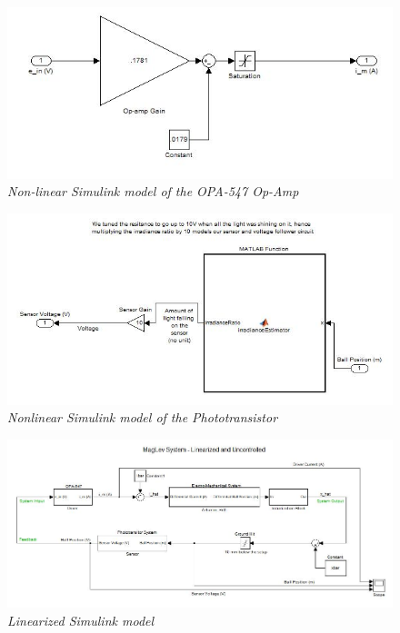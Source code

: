 \documentclass{article}
\theoremstyle{plain}
\theoremstyle{definition}
\theoremstyle{remark}
\begin{document}
\begin{figure}
\begin{center}
\includegraphics[width = 15cm]{NonLinearUnControlledDriver}
\caption{\emph{Non-linear Simulink model of the OPA-547 Op-Amp}}
\label{Q1_e5}
\end{center}
\end{figure}


\begin{figure}
\begin{center}
\includegraphics[width = 15cm]{NonLinearUnControlledPhototransistor}
\caption{\emph{Nonlinear Simulink model of the Phototransistor}}
\label{Q1_e2}
\end{center}
\end{figure}


\begin{figure}
\begin{center}
\includegraphics[width = 15cm]{LinearUnControlledComplete}
\caption{\emph{Linearized Simulink model}}
\label{Q1_e6}
\end{center}
\end{figure}
\end{document}
